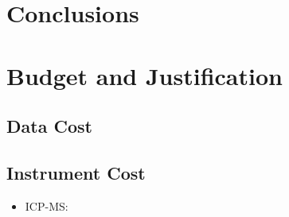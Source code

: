 \documentclass[12pt]{article}
\begin{document}
\section{Conclusions}
\section{Budget and Justification}
\subsection{Data Cost}

\subsection{Instrument Cost}
\begin{itemize}
    \item ICP-MS: 
\end{itemize}

\newpage
\printbibliography
\end{document}
